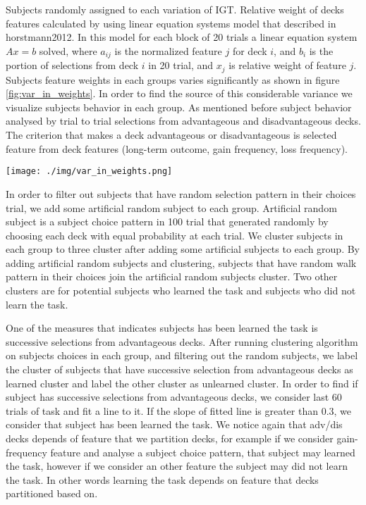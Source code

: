 Subjects randomly assigned to each variation of IGT.
Relative weight of decks features calculated  by using
linear equation systems model that described in
horstmann2012. In this model for each block of 20 trials a
linear equation system $Ax = b$ solved, where $ a_{ij} $ is the
normalized feature $j$ for deck $i$, and $ b_i $ is the portion of
selections from deck $i$ in 20 trial, and $ x_j $  is relative weight of
feature $j$. Subjects feature weights in each groups varies
significantly as shown in figure \ref{fig:var_in_weights}. In order to find the
source of this considerable variance we visualize subjects
behavior in each group. As mentioned before subject behavior
analysed by trial to trial selections from advantageous and disadvantageous
decks. The criterion that makes a deck advantageous or disadvantageous is
selected feature from deck features (long-term outcome, gain frequency, loss
frequency). 


\begin{figure*}
\caption{Calculated feature weights for each block}
\label{fig:var_in_weights}
\centering
\texttt{[image: ./img/var\_in\_weights.png]}
\end{figure*}

In order to filter out subjects that have random selection
pattern in their choices trial, we add some artificial random
subject to each group. Artificial random subject is a
subject choice pattern in 100 trial that generated randomly
by choosing each deck with equal probability at each trial.
We cluster subjects in each group to three cluster after
adding some artificial subjects to each group. By adding
artificial random subjects and clustering, subjects that
have random walk pattern in their choices join the
artificial random subjects cluster. Two other clusters are
for potential subjects who learned the task and subjects who
did not learn the task.

One of the measures that indicates subjects has been learned
the task is successive selections from advantageous decks.
After running clustering algorithm on subjects choices in
each group, and filtering out the random subjects, we label
the cluster of subjects that have successive selection from
advantageous decks as learned cluster and label the other
cluster as unlearned cluster. In order to find if subject
has successive selections from advantageous decks, we
consider last 60 trials of task and fit a line to it. If the
slope of fitted line is greater than 0.3, we consider that
subject has been learned the task. We notice again that
adv/dis decks depends of feature that we partition decks,
for example if we consider gain-frequency feature and
analyse a subject choice pattern, that subject may learned
the task, however if we consider an other feature the
subject may did not learn the task. In other words learning
the task depends on feature that decks partitioned based on.

